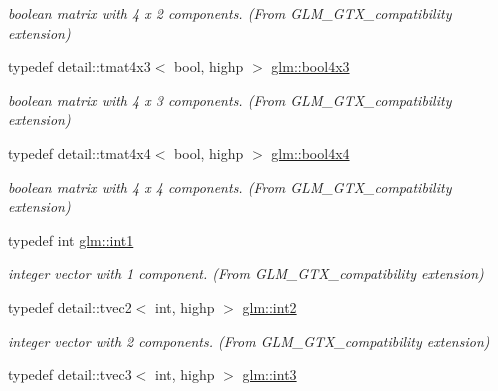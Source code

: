 \begin{CompactItemize}
\begin{CompactList}\small\item\em boolean matrix with 4 x 2 components. (From GLM\_\-GTX\_\-compatibility extension) \item\end{CompactList}\item 
\hypertarget{group__gtx__compatibility_g7acb207ab877c53dc5751752e1f70053}{
typedef detail::tmat4x3$<$ bool, highp $>$ \hyperlink{group__gtx__compatibility_g7acb207ab877c53dc5751752e1f70053}{glm::bool4x3}}
\label{group__gtx__compatibility_g7acb207ab877c53dc5751752e1f70053}

\begin{CompactList}\small\item\em boolean matrix with 4 x 3 components. (From GLM\_\-GTX\_\-compatibility extension) \item\end{CompactList}\item 
\hypertarget{group__gtx__compatibility_g4738dad3625bfa64ddf218897da020e9}{
typedef detail::tmat4x4$<$ bool, highp $>$ \hyperlink{group__gtx__compatibility_g4738dad3625bfa64ddf218897da020e9}{glm::bool4x4}}
\label{group__gtx__compatibility_g4738dad3625bfa64ddf218897da020e9}

\begin{CompactList}\small\item\em boolean matrix with 4 x 4 components. (From GLM\_\-GTX\_\-compatibility extension) \item\end{CompactList}\item 
\hypertarget{group__gtx__compatibility_gba41d7803e4b24c17656d74377b88286}{
typedef int \hyperlink{group__gtx__compatibility_gba41d7803e4b24c17656d74377b88286}{glm::int1}}
\label{group__gtx__compatibility_gba41d7803e4b24c17656d74377b88286}

\begin{CompactList}\small\item\em integer vector with 1 component. (From GLM\_\-GTX\_\-compatibility extension) \item\end{CompactList}\item 
\hypertarget{group__gtx__compatibility_g3f999377257cbda84c745b688ddcba81}{
typedef detail::tvec2$<$ int, highp $>$ \hyperlink{group__gtx__compatibility_g3f999377257cbda84c745b688ddcba81}{glm::int2}}
\label{group__gtx__compatibility_g3f999377257cbda84c745b688ddcba81}

\begin{CompactList}\small\item\em integer vector with 2 components. (From GLM\_\-GTX\_\-compatibility extension) \item\end{CompactList}\item 
\hypertarget{group__gtx__compatibility_gc305b0da08fad90d91854569679c935e}{
typedef detail::tvec3$<$ int, highp $>$ \hyperlink{group__gtx__compatibility_gc305b0da08fad90d91854569679c935e}{glm::int3}}
\label{group__gtx__compatibility_gc305b0da08fad90d91854569679c935e}


\end{CompactItemize}
